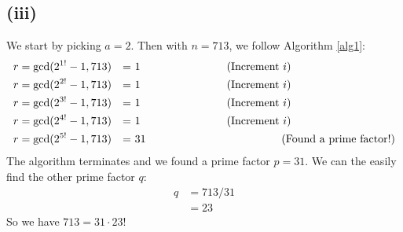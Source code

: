 \documentclass[a4paper, fleqn]{article}
\newcommand{\comment}[1]{%
  \text{\phantom{(#1)}} \tag{#1}}
\begin{document}
\subsection{(iii)}
We start by picking $a=2$. Then with $n=713$, we follow Algorithm \ref{alg1}:
\begin{align*}
  r &= \gcd(2^{1!}-1, 713) &= &\ 1 \comment{Increment $i$} \\
  r &= \gcd(2^{2!}-1, 713) &= &\ 1 \comment{Increment $i$} \\
  r &= \gcd(2^{3!}-1, 713) &= &\ 1 \comment{Increment $i$} \\
  r &= \gcd(2^{4!}-1, 713) &= &\ 1 \comment{Increment $i$} \\
  r &= \gcd(2^{5!}-1, 713) &= &\ 31\comment{Found a prime factor!}
\end{align*}
The algorithm terminates and we found a prime factor $p=31$. We can the easily find the other prime factor $q$:
\begin{align*}
  q &= 713/31 \\
    &= 23
\end{align*}
So we have $713=31\cdot 23$!
\end{document}

